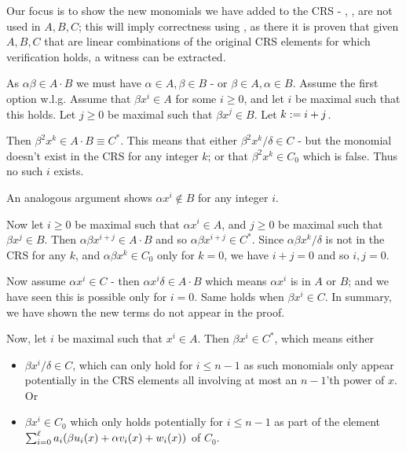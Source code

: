 \documentclass{article}
\begin{document}
Our focus is to show the new monomials we have added to the CRS -  , ,
are not used in $A,B,C$; this will imply correctness using \cite{Groth16},
as there it is proven that given $A,B,C$ that are linear combinations of the original CRS elements for which verification holds, a witness can be extracted.


As $\alpha\beta \in A\cdot B$ we must have $\alpha\in A,\beta \in B$ - 
or $\beta\in A, \alpha \in B$.
Assume the first option w.l.g.
Assume that $\beta x^i \in A$ for some $i\geq 0$, and let
$i$ be maximal such that this holds.
Let $j\geq 0$ be maximal such that $\beta x^j\in B$. Let $k:= i+j$.

Then $\beta^2 x^{k} \in A\cdot B\equiv C^*$.
This means that either $\beta^2 x^{k}/\delta \in C$ - but the monomial doesn't exist in the CRS for any integer $k$;
or that $\beta^2 x^{k}\in C_0$ which is false.
Thus no such $i$ exists.

An analogous argument shows $\alpha x^i \notin B$ for any integer $i$.

Now let $i\geq 0$ be maximal such that $\alpha x^i\in A$,
and $j\geq 0$ be maximal such that $\beta x^j\in B$.
Then 
$\alpha\beta x^{i+j} \in A\cdot B$
and so $\alpha \beta x^{i+j}\in C^*$.
Since $\alpha\beta x^k/\delta$ is not in the CRS for any $k$, and $\alpha\beta x^k \in C_0$ only for $k=0$, we have $i+j =0$ and so $i,j =0$.



Now assume $\alpha x^i \in C$ - then $\alpha x^i \delta \in A\cdot B$ which means $\alpha x^i $ is in $A$ or $B$;
and we have seen this is possible only for $i=0$. Same holds when $\beta x^i \in C$.
In summary, we have shown the new terms 
do not appear in the proof.



Now, let $i$ be maximal such that $x^i \in A$.
Then $\beta x^i \in C^*$,
which means either 
\begin{itemize}
 \item $\beta x^i/\delta \in C$, which can only hold for $i\leq n-1$ as such monomials only appear potentially in the CRS 
elements   all involving at most an $n-1$'th power of $x$. Or

\item  $\beta x^i \in C_0$ which only holds potentially for $i\leq n-1$ as part of the element
$\sum_{i=0}^{\ell}a_i(\beta u_i(x)+\alpha v_i(x) +w_i(x))$ of $C_0$.
\end{itemize}
\end{document}
